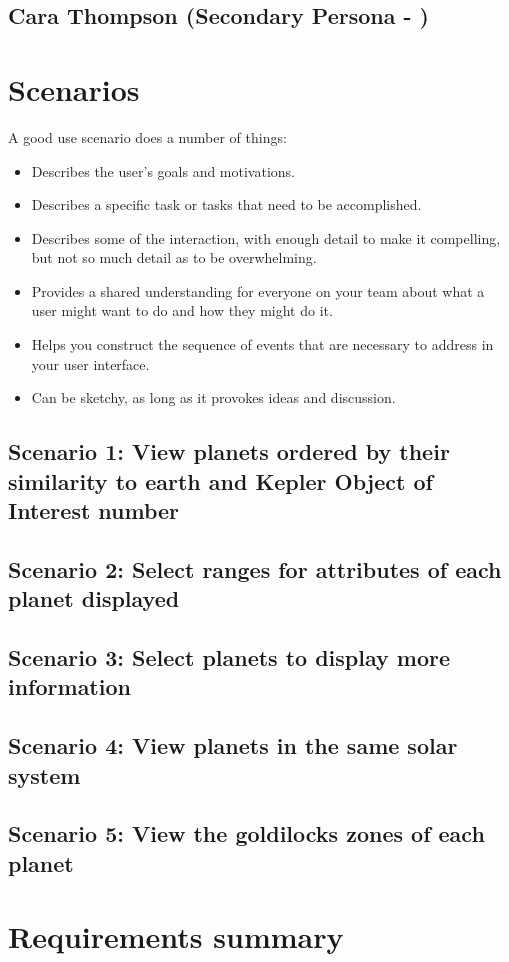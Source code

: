 \subsection{Cara Thompson (Secondary Persona - )}

\section{Scenarios}
 A good use scenario does a number of things:
\begin{itemize}
 \item Describes the user's goals and motivations.
  \item Describes a specific task or tasks that need to be accomplished.
   \item Describes some of the interaction, with enough detail to make it compelling, but not so much detail as to be overwhelming.
    \item Provides a shared understanding for everyone on your team about what a user might want to do and how they might do it.
     \item Helps you construct the sequence of events that are necessary to address in your user interface.
     \item Can be sketchy, as long as it provokes ideas and discussion.
\end{itemize}
 \subsection{Scenario 1: View planets ordered by their similarity to earth and Kepler Object of Interest number}
 \subsection{Scenario 2: Select ranges for attributes of each planet displayed}
 \subsection{Scenario 3: Select planets to display more information}
 \subsection{Scenario 4: View planets in the same solar system}
 \subsection{Scenario 5: View the goldilocks zones of each planet}
\section{Requirements summary}


